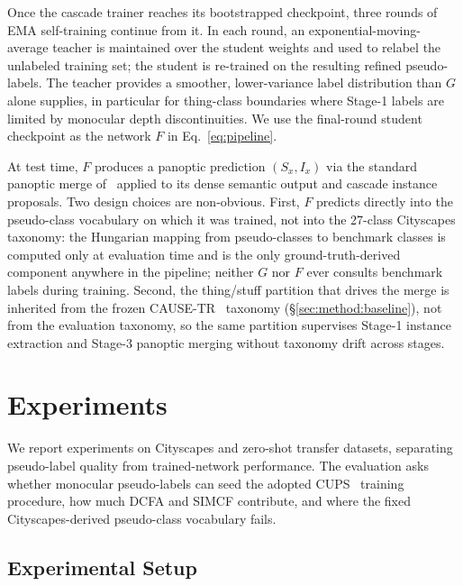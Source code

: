 \documentclass{article}
\begin{document}
Once the cascade trainer reaches its bootstrapped checkpoint, three rounds of EMA self-training continue from it. In each round, an exponential-moving-average teacher is maintained over the student weights and used to relabel the unlabeled training set; the student is re-trained on the resulting refined pseudo-labels. The teacher provides a smoother, lower-variance label distribution than $G$ alone supplies, in particular for thing-class boundaries where Stage-1 labels are limited by monocular depth discontinuities. We use the final-round student checkpoint as the network $F$ in Eq.~\ref{eq:pipeline}.

At test time, $F$ produces a panoptic prediction $(S_x, I_x)$ via the standard panoptic merge of~\cite{kirillov2019panoptic} applied to its dense semantic output and cascade instance proposals. Two design choices are non-obvious. First, $F$ predicts directly into the pseudo-class vocabulary on which it was trained, not into the 27-class Cityscapes taxonomy: the Hungarian mapping from pseudo-classes to benchmark classes is computed only at evaluation time and is the only ground-truth-derived component anywhere in the pipeline; neither $G$ nor $F$ ever consults benchmark labels during training. Second, the thing/stuff partition that drives the merge is inherited from the frozen CAUSE-TR~\cite{kim2024cause} taxonomy (§\ref{sec:method:baseline}), not from the evaluation taxonomy, so the same partition supervises Stage-1 instance extraction and Stage-3 panoptic merging without taxonomy drift across stages.

\FloatBarrier
\section{Experiments}
\label{sec:experiments}

We report experiments on Cityscapes and zero-shot transfer datasets, separating pseudo-label quality from trained-network performance. The evaluation asks whether monocular pseudo-labels can seed the adopted CUPS~\cite{hahn2025cups} training procedure, how much DCFA and SIMCF contribute, and where the fixed Cityscapes-derived pseudo-class vocabulary fails.

\subsection{Experimental Setup}
\label{sec:exp:setup}
\end{document}
